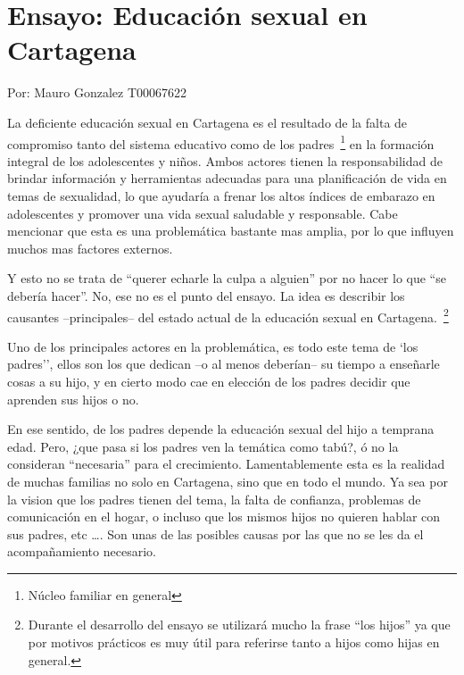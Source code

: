 \documentclass[letterpaper, 12pt]{article}
\begin{document}
\section*{Ensayo: Educación sexual en Cartagena}

\noindent\makebox[\linewidth]{\rule{\textwidth}{0.4pt}}

Por: Mauro Gonzalez T00067622

\noindent\makebox[\linewidth]{\rule{\textwidth}{0.4pt}}

\bigskip


La deficiente educación sexual en Cartagena es el resultado
de la falta de compromiso tanto del sistema educativo como
de los padres~\footnote{Núcleo familiar en general} en la
formación integral de los adolescentes y niños. Ambos
actores tienen la responsabilidad de brindar información y
herramientas adecuadas para una planificación de vida en
temas de sexualidad, lo que ayudaría a frenar los altos
índices de embarazo en adolescentes y promover una vida
sexual saludable y responsable. Cabe mencionar que esta es
una problemática bastante mas amplia, por lo que influyen
muchos mas factores externos.

Y esto no se trata de ``querer echarle la culpa a alguien''
por no hacer lo que ``se debería hacer''. No, ese no es el
punto del ensayo. La idea es describir los causantes
--principales-- del estado actual de la educación sexual en
Cartagena.~\footnote{Durante el desarrollo del ensayo se
    utilizará mucho la frase ``los hijos'' ya que por motivos
    prácticos es muy útil para referirse tanto a hijos como
    hijas en general.}

Uno de los principales actores en la problemática, es todo
este tema de `los padres'', ellos son los que dedican --o
al menos deberían-- su tiempo a enseñarle cosas a su hijo,
y en cierto modo cae en elección de los padres decidir que
aprenden sus hijos o no.

En ese sentido, de los padres depende la educación sexual
del hijo a temprana edad. Pero, ¿que pasa si los padres ven
la temática como tabú?, ó no la consideran ``necesaria''
para el crecimiento. Lamentablemente esta es la realidad de
muchas familias no solo en Cartagena, sino que en todo el
mundo. Ya sea por la vision que los padres tienen del tema,
la falta de confianza, problemas de comunicación en el
hogar, o incluso que los mismos hijos no quieren hablar con
sus padres, etc \dots. Son unas de las posibles causas por
las que no se les da el acompañamiento necesario.
\end{document}
